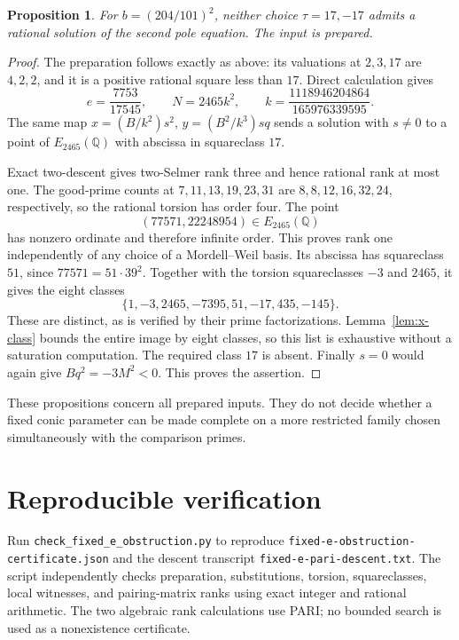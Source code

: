 \documentclass[11pt,a4paper]{article}
\newtheorem{proposition}[theorem]{Proposition}
\theoremstyle{definition}\newtheorem{definition}[theorem]{Definition}
\newcommand{\Q}{\mathbb Q}\newcommand{\Z}{\mathbb Z}
\begin{document}
\begin{proposition}
For $b=(204/101)^2$, neither choice $\tau=17,-17$ admits a
rational solution of the second pole equation. The input is prepared.
\end{proposition}
\begin{proof}
The preparation follows exactly as above: its valuations at
$2,3,17$ are $4,2,2$, and it is a positive rational square less
than $17$. Direct calculation gives
\[
 e=\frac{7753}{17545},\qquad
 N=2465k^2,\qquad
 k=\frac{1118946204864}{165976339595}.
\]
The same map
$x=(B/k^2)s^2$, $y=(B^2/k^3)sq$ sends a solution with
$s\ne0$ to a point of $E_{2465}(\Q)$ with abscissa in
squareclass $17$.

Exact two-descent gives two-Selmer rank three and hence rational
rank at most one. The good-prime counts at $7,11,13,19,23,31$
are $8,8,12,16,32,24$, respectively, so the rational torsion has
order four. The point
\[
                  (77571,22248954)\in E_{2465}(\Q)
\]
has nonzero ordinate and therefore infinite order. This proves
rank one independently of any choice of a Mordell--Weil basis.
Its abscissa has squareclass $51$, since $77571=51\cdot39^2$.
Together with the torsion squareclasses $-3$ and $2465$, it gives
the eight classes
\[
 \{1,-3,2465,-7395,51,-17,435,-145\}.
\]
These are distinct, as is verified by their prime factorizations.
Lemma~\ref{lem:x-class} bounds the entire image by eight classes,
so this list is exhaustive without a saturation computation.
The required class $17$ is absent. Finally $s=0$ would again
give $Bq^2=-3M^2<0$. This proves the assertion.
\end{proof}

These propositions concern all prepared inputs. They do not decide
whether a fixed conic parameter can be made complete on a more
restricted family chosen simultaneously with the comparison primes.

\section*{Reproducible verification}

Run \nolinkurl{check_fixed_e_obstruction.py} to reproduce
\nolinkurl{fixed-e-obstruction-certificate.json} and the descent
transcript \nolinkurl{fixed-e-pari-descent.txt}.
The script independently checks preparation, substitutions, torsion,
squareclasses, local witnesses, and pairing-matrix ranks using exact
integer and rational arithmetic. The two algebraic rank calculations
use PARI; no bounded search is used as a nonexistence certificate.
\end{document}
